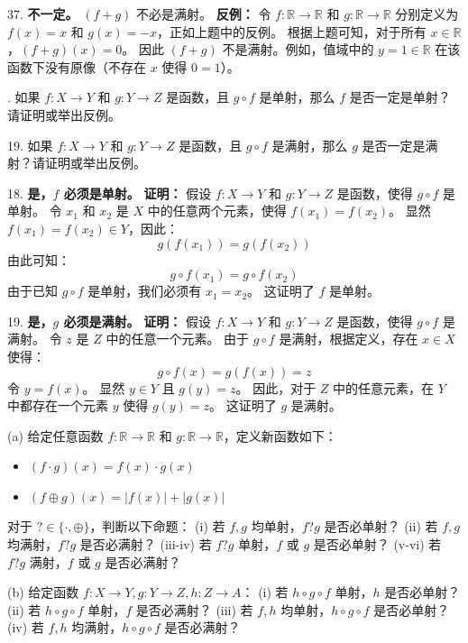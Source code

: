 \begin{questions}
\begin{solution}
37. \textbf{不一定。} $(f + g)$ 不必是满射。
\textbf{反例：}
令 $f: \mathbb{R} \to \mathbb{R}$ 和 $g: \mathbb{R} \to \mathbb{R}$ 分别定义为 $f(x) = x$ 和 $g(x) = -x$，正如上题中的反例。
根据上题可知，对于所有 $x \in \mathbb{R}$，$(f + g)(x) = 0$。
因此 $(f + g)$ 不是满射。例如，值域中的 $y = 1 \in \mathbb{R}$ 在该函数下没有原像（不存在 $x$ 使得 $0 = 1$）。
\end{solution}

. 如果 $f: X \to Y$ 和 $g: Y \to Z$ 是函数，且 $g \circ f$ 是单射，那么 $f$ 是否一定是单射？请证明或举出反例。

19. 如果 $f: X \to Y$ 和 $g: Y \to Z$ 是函数，且 $g \circ f$ 是满射，那么 $g$ 是否一定是满射？请证明或举出反例。

\begin{solution}
18. \textbf{是，$f$ 必须是单射。}
\textbf{证明：}
假设 $f: X \to Y$ 和 $g: Y \to Z$ 是函数，使得 $g \circ f$ 是单射。
令 $x_1$ 和 $x_2$ 是 $X$ 中的任意两个元素，使得 $f(x_1) = f(x_2)$。
显然 $f(x_1) = f(x_2) \in Y$，因此：
\[
g(f(x_1)) = g(f(x_2))
\]
由此可知：
\[
g \circ f(x_1) = g \circ f(x_2)
\]
由于已知 $g \circ f$ 是单射，我们必须有 $x_1 = x_2$。
这证明了 $f$ 是单射。

19. \textbf{是，$g$ 必须是满射。}
\textbf{证明：}
假设 $f: X \to Y$ 和 $g: Y \to Z$ 是函数，使得 $g \circ f$ 是满射。
令 $z$ 是 $Z$ 中的任意一个元素。
由于 $g \circ f$ 是满射，根据定义，存在 $x \in X$ 使得：
\[
g \circ f(x) = g(f(x)) = z
\]
令 $y = f(x)$。
显然 $y \in Y$ 且 $g(y) = z$。
因此，对于 $Z$ 中的任意元素，在 $Y$ 中都存在一个元素 $y$ 使得 $g(y) = z$。
这证明了 $g$ 是满射。
\end{solution}

\question
(a) 给定任意函数 $f: \mathbb{R} \to \mathbb{R}$ 和 $g: \mathbb{R} \to \mathbb{R}$，定义新函数如下：
\begin{itemize}
    \item $(f \cdot g)(x) = f(x) \cdot g(x)$
    \item $(f \oplus g)(x) = |f(x)| + |g(x)|$
\end{itemize}
对于 $? \in \{\cdot, \oplus\}$，判断以下命题：
(i) 若 $f, g$ 均单射，$f ? g$ 是否必单射？
(ii) 若 $f, g$ 均满射，$f ? g$ 是否必满射？
(iii-iv) 若 $f ? g$ 单射，$f$ 或 $g$ 是否必单射？
(v-vi) 若 $f ? g$ 满射，$f$ 或 $g$ 是否必满射？

(b) 给定函数 $f: X \to Y, g: Y \to Z, h: Z \to A$：
(i) 若 $h \circ g \circ f$ 单射，$h$ 是否必单射？
(ii) 若 $h \circ g \circ f$ 单射，$f$ 是否必满射？
(iii) 若 $f, h$ 均单射，$h \circ g \circ f$ 是否必单射？
(iv) 若 $f, h$ 均满射，$h \circ g \circ f$ 是否必满射？


\end{questions}
